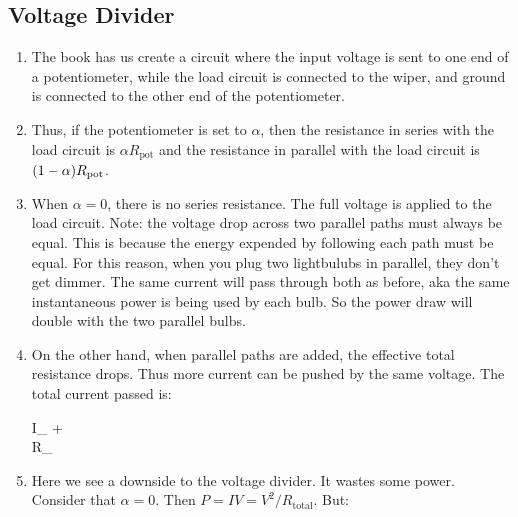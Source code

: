 \documentclass[11pt, oneside]{amsart}
\begin{document}
\subsection{Voltage Divider}

\newcommand{\Rtot}{R_\text{total}}
\newcommand{\Rload}{R_\text{load}}
\newcommand{\Rpot}{R_\text{pot}}

\begin{enumerate}
  \item The book has us create a circuit where the input voltage is sent
  to one end of a potentiometer, while the load circuit is connected to
  the wiper, and ground is connected to the other end of the
  potentiometer.


  \item Thus, if the potentiometer is set to $\alpha$, then the
  resistance in series with the load circuit is $\alpha \Rpot$ and the
  resistance in parallel with the load circuit is $\parens{1 - \alpha}
  \Rpot$.

  \item When $\alpha = 0$, there is no series resistance. The full
  voltage is applied to the load circuit. Note: the voltage drop across
  two parallel paths must always be equal. This is because the energy
  expended by following each path must be equal. For this reason, when
  you plug two lightbulubs in parallel, they don't get dimmer. The same
  current will pass through both as before, aka the same instantaneous
  power is being used by each bulb. So the power draw will double with
  the two parallel bulbs.

  \item On the other hand, when parallel paths are added, the effective
  total resistance drops. Thus more current can be pushed by the same
  voltage. The total current passed is:

  \begin{nedqn}
    I_
  \eqcol
     + 
  \\
    \Rtot
  \eqcol
  \\
  \eqcol
  \end{nedqn}

  \item Here we see a downside to the voltage divider. It wastes some
  power. Consider that $\alpha = 0$. Then $P = IV = V^2/\Rtot$. But:


\end{enumerate}
\end{document}
